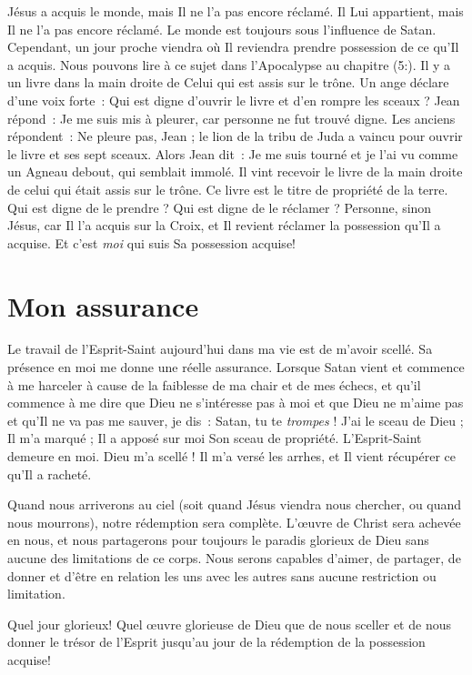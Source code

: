 Jésus a acquis le monde, mais Il ne l'a pas encore réclamé.
 Il Lui appartient, mais Il ne l'a pas encore réclamé.
 Le monde est toujours sous l'influence de Satan.
 Cependant, un jour proche viendra où Il reviendra prendre possession
 de ce qu'Il a acquis.
 Nous pouvons lire à ce sujet dans l'Apocalypse
 au chapitre (5:).
 Il y a un livre dans la main droite de Celui qui est assis sur le trône.
 Un ange déclare d'une voix forte~:
 \og Qui est digne d'ouvrir le livre et d'en rompre les sceaux ? \og
 Jean répond~: \og Je me suis mis à pleurer,
 car personne ne fut trouvé digne. \fg{}
 Les anciens répondent~: \og Ne pleure pas, Jean ;
 le lion de la tribu de Juda a vaincu pour ouvrir
 le livre et ses sept sceaux. \fg{}
 Alors Jean dit~: \og Je me suis tourné et je l'ai vu comme un Agneau debout,
 qui semblait immolé. Il vint recevoir le livre de la main droite
 de celui qui était assis sur le trône. \fg{}
 Ce livre est le titre de propriété de la terre.
 Qui est digne de le prendre ? Qui est digne de le réclamer ?
 Personne, sinon Jésus, car Il l'a acquis sur la Croix, et Il revient
 réclamer la possession qu'Il a acquise.
 Et c'est \emph{moi} qui suis Sa possession acquise!


\section*{Mon assurance}

Le travail de l'Esprit-Saint aujourd'hui dans ma vie est de m'avoir scellé.
 Sa présence en moi me donne une réelle assurance.
 Lorsque Satan vient et commence à me harceler à cause de la faiblesse
 de ma chair et de mes échecs, et qu'il commence à me dire que Dieu
 ne s'intéresse pas à moi et que Dieu ne m'aime pas et qu'Il ne va pas
 me sauver, je dis~:
 \og Satan, tu te \emph{trompes} ! J'ai le sceau de Dieu ; Il m'a marqué ;
 Il a apposé sur moi Son sceau de propriété. L'Esprit-Saint demeure en moi.
 Dieu m'a scellé ! Il m'a versé les arrhes, et Il vient récupérer
 ce qu'Il a racheté. \fg{}

Quand nous arriverons au ciel (soit quand Jésus viendra nous chercher,
 ou quand nous mourrons), notre rédemption sera complète.
 L'œu\-vre de Christ sera achevée en nous, et nous partagerons pour
 toujours le paradis glorieux de Dieu sans aucune des limitations
 de ce corps. Nous serons capables d'aimer, de partager, de donner
 et d'être en relation les uns avec les autres sans aucune restriction
 ou limitation.

Quel jour glorieux! Quel œuvre glorieuse de Dieu que de nous sceller
 et de nous donner le trésor de l'Esprit jusqu'au jour de la rédemption
 de la possession acquise!


